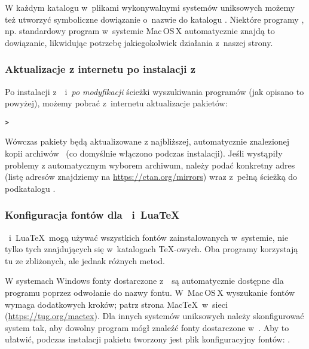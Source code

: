 \documentclass{article}
\begin{document}
W każdym katalogu w~plikami wykonywalnymi systemów uniksowych możemy też utworzyć
symboliczne dowiązanie o~nazwie  do katalogu
. Niektóre programy , np. standardowy
program  w~systemie Mac\,OS\,X  automatycznie znajdą to dowiązanie,
likwidując potrzebę jakiegokolwiek działania z~naszej strony.

\subsubsection{Aktualizacje z internetu po instalacji z \DVD}
\label{sec:dvd-install-net-updates}

Po instalacji \TL{} z~\DVD\ i~\textit{po modyfikacji} ścieżki wyszukiwania
programów (jak opisano to powyżej), możemy pobrać z~internetu aktualizacje
pakietów:

\begin{alltt}
> 
\end{alltt}

Wówczas pakiety będą aktualizowane z najbliższej, automatycznie
znalezionej kopii archiwów \CTAN\ (co domyślnie włączono podczas instalacji).
Jeśli wystąpiły problemy z automatycznym wyborem archiwum, należy podać
konkretny adres (listę adresów znajdziemy na \url{https://ctan.org/mirrors})
wraz z~pełną ścieżką do podkatalogu .

\subsubsection{Konfiguracja fontów dla \protect\XeTeX\protect\ i~Lua\protect\TeX}
\label{sec:font-conf-sys}

\XeTeX\ i~Lua\TeX\ mogą używać wszystkich fontów zainstalowanych w~systemie, nie
tylko tych znajdujących się  w~katalogach \TeX-owych. Oba programy korzystają
tu ze zbliżonych, ale jednak różnych metod.

W systemach Windows fonty dostarczone z~\TL\ są automatycznie dostępne
dla programu \XeTeX{} poprzez odwołanie do nazwy fontu. W~Mac\,OS\,X{}
wyszukanie fontów wymaga dodatkowych kroków; patrz strona Mac\TeX\ w~sieci
(\url{https://tug.org/mactex}). Dla innych systemów uniksowych należy
skonfigurować system tak, aby dowolny program mógł znaleźć fonty
dostarczone w~\TL. Aby to ułatwić, podczas instalacji pakietu
 tworzony jest plik konfiguracyjny fontów:
.
\end{document}
